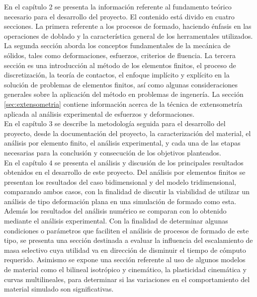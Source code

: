 En el capítulo 2 se presenta la información referente al fundamento teórico necesario para el 
desarrollo del proyecto. El contenido está divido en cuatro secciones. La primera referente 
a los procesos de formado, haciendo énfasis en las operaciones de doblado y la 
característica general de los herramentales utilizados. La segunda sección aborda 
los conceptos fundamentales de la mecánica de sólidos, tales como deformaciones, esfuerzos, 
criterios de fluencia. La tercera sección es una introducción al método de los elementos finitos, 
el proceso de discretización, la teoría de contactos, el enfoque implícito y explícito en 
la solución de problemas de elementos finitos, así como algunas consideraciones generales 
sobre la aplicación del método en problemas de ingenería. La sección \ref{sec:extensometria} 
contiene información acerca de la técnica de extensometría aplicada al análisis experimental 
de esfuerzos y deformaciones. \\

En el capítulo 3 se describe la metodología seguida para el desarrollo del proyecto, 
desde la documentación del proyecto, la caracterización del material, el análisis por 
elemento finito, el análisis experimental, y cada una de las etapas necesarias para 
la conclusión y consecución de los objetivos planteados.\\

En el capítulo 4 se presenta el análisis y discusión de los principales resultados 
obtenidos en el desarrollo de este proyecto. Del análisis por elementos finitos 
se presentan los resultados del caso bidimensional y del modelo tridimensional, comparando 
ambos casos, con la finalidad de discutir la viabilidad de utilizar un análisis de tipo 
deformación plana en una simulación de formado como esta. Además los resultados del 
análisis numérico se comparan con lo obtenido mediante el análisis experimental.
Con la finalidad de determinar algunas condiciones o parámetros que faciliten 
el análisis de procesos de formado de este tipo, se presenta una sección destinada 
a evaluar la influencia del escalamiento de masa selectivo cuya utilidad va en 
dirección de disminuir el tiempo de cómputo requerido. Asimismo se expone una sección 
referente al uso de algunos modelos de material como el bilineal isotrópico y cinemático, 
la plasticidad cinemática y curvas multilineales, para determinar si las variaciones 
en el comportamiento del material simulado son significativas.\\

